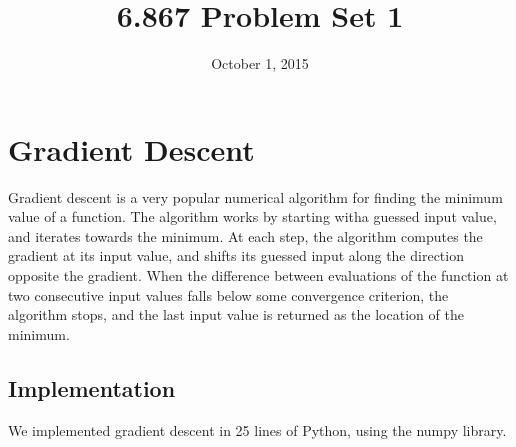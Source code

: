 \documentclass{article}
\title{6.867 Problem Set 1}
\date{October 1, 2015}
\begin{document}
\maketitle
\section{Gradient Descent}
Gradient descent is a very popular numerical algorithm for finding the minimum value of a function. The algorithm works by starting witha guessed input value, and iterates towards the minimum. At each step, the algorithm computes the gradient at its input value, and shifts its guessed input along the direction opposite the gradient. When the difference between evaluations of the function at two consecutive input values falls below some convergence criterion, the algorithm stops, and the last input value is returned as the location of the minimum.

\subsection{Implementation}
We implemented gradient descent in 25 lines of Python, using the numpy library. 
\end{document}
